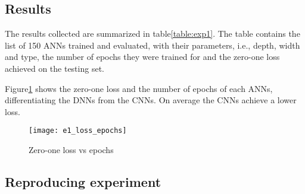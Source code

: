 \subsection{Results}
The results collected are summarized in table\ref{table:exp1}. The table contains the list of 150 ANNs trained and evaluated, with their parameters, i.e., depth, width and type, the number of epochs they were trained for and the zero-one loss achieved on the testing set.

Figure\ref{fig:e1_loss_epochs} shows the zero-one loss and the number of epochs of each ANNs, differentiating the DNNs from the CNNs. On average the CNNs achieve a lower loss.
\begin{figure}
\texttt{[image: e1\_loss\_epochs]}
\caption{Zero-one loss vs epochs}\label{fig:e1_loss_epochs}
\end{figure}
\subsection{Reproducing experiment}
